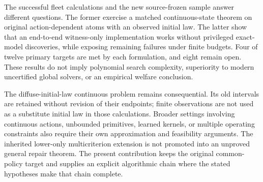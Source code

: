 The successful fleet calculations and the new source-frozen sample answer different questions. The former exercise a matched continuous-state theorem on original action-dependent atoms with an observed initial law. The latter show that an end-to-end witness-only implementation works without privileged exact-model discoveries, while exposing remaining failures under finite budgets. Four of twelve primary targets are met by each formulation, and eight remain open. These results do not imply polynomial search complexity, superiority to modern uncertified global solvers, or an empirical welfare conclusion.

The diffuse-initial-law continuous problem remains consequential. Its old intervals are retained without revision of their endpoints; finite observations are not used as a substitute initial law in those calculations. Broader settings involving continuous actions, unbounded primitives, learned kernels, or multiple operating constraints also require their own approximation and feasibility arguments. The inherited lower-only multicriterion extension is not promoted into an unproved general repair theorem. The present contribution keeps the original common-policy target and supplies an explicit algorithmic chain where the stated hypotheses make that chain complete.
